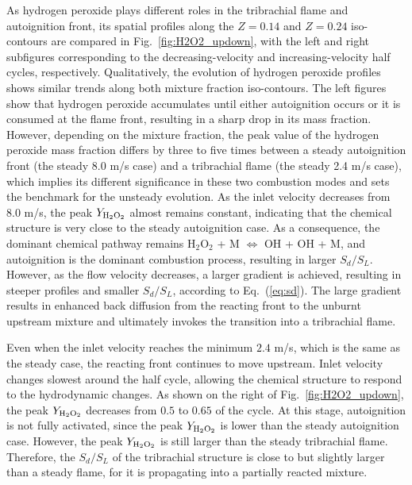\documentclass[review,3p,times]{elsarticle}
\begin{document}
\textcolor{Rev1}{As hydrogen peroxide plays different roles in the tribrachial flame and autoignition front, its spatial profiles along the $Z = 0.14$ and $Z = 0.24$ iso-contours are compared in Fig.~\ref{fig:H2O2_updown}, with the left and right subfigures corresponding to the decreasing-velocity and increasing-velocity half cycles, respectively.  Qualitatively, the evolution of hydrogen peroxide profiles shows similar trends along both mixture fraction iso-contours.  The left figures show that hydrogen peroxide accumulates until either autoignition occurs or it is consumed at the flame front, resulting in a sharp drop in its mass fraction.  However, depending on the mixture fraction, the peak value of the hydrogen peroxide mass fraction differs by three to five times between a steady autoignition front (the steady 8.0 m/s case) and a tribrachial flame (the steady 2.4 m/s case), which implies its different significance in these two combustion modes and sets the benchmark for the unsteady evolution.}  As the inlet velocity decreases from $8.0$ m/s, the peak $Y_{\rm H{_2}O{_2}}$ almost remains constant, indicating that the chemical structure is very close to the steady autoignition case.  As a consequence, the dominant chemical pathway remains H$_2$O$_2$ + M $\Longleftrightarrow$ OH + OH + M, and autoignition is the dominant combustion process, resulting in larger $S_d/S_L$.  However, as the flow velocity decreases, a larger gradient is achieved, resulting in steeper profiles and smaller $S_d/S_L$, according to Eq.~(\ref{eq:sd}).  \textcolor{Rev1}{The large gradient results in enhanced back diffusion from the reacting front to the unburnt upstream mixture and ultimately invokes the transition into a tribrachial flame.}       

Even when the inlet velocity reaches the minimum $2.4$ m/s, which is the same as the steady case, the reacting front continues to move upstream.  Inlet velocity changes slowest around the half cycle, allowing the chemical structure to respond to the hydrodynamic changes.  As shown on the right of Fig.~\ref{fig:H2O2_updown}, the peak $Y_{\rm H{_2}O{_2}}$ decreases from $0.5$ to $0.65$ of the cycle.  At this stage, autoignition is not fully activated, since the peak $Y_{\rm H{_2}O{_2}}$ is lower than the steady autoignition case.  However, the peak $Y_{\rm H{_2}O{_2}}$ is still larger than the steady tribrachial flame.  Therefore, the $S_d/S_L$ of the tribrachial structure is close to but slightly larger than a steady flame, for it is propagating into a partially reacted mixture.  
\end{document}
